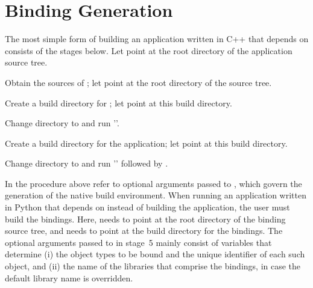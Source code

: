 \section{Binding Generation}
\label{sec:gen}
The most simple form of building an application written in C++ that
depends on \cgal{} consists of the stages below. Let
 point at the root directory of the
application source tree.
\begin{compactenum}
\item Obtain the sources of \cgal{}; let
   point at the root directory of the
  \cgal{} source tree.
\item Create a build directory for \cgal{}; let
   point at this build directory.
\item Change directory to  and run
  ''.
\item Create a build directory for the application; let
   point at this build directory.
\item Change directory to  and run
  '' followed by
  .
\end{compactenum}
\noindent
In the procedure above  refer to optional
arguments passed to , which govern the generation
of the native build environment. When running an application written
in Python that depends on \cgal{} instead of building the application,
the user must build the bindings. Here, 
needs to point at the root directory of the binding source tree, and
 needs to point at the build directory for the
bindings. The optional arguments passed to  in
stage~5 mainly consist of variables that determine (i) the object
types to be bound and the unique identifier of each such object, and
(ii) the name of the libraries that comprise the bindings, in case the
default library name is overridden.


